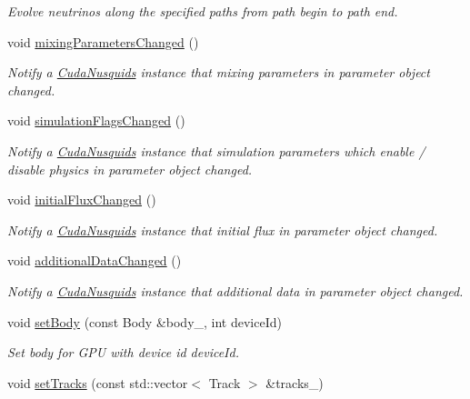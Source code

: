 \begin{DoxyCompactItemize}
\begin{DoxyCompactList}\small\item\em Evolve neutrinos along the specified paths from path begin to path end. \end{DoxyCompactList}\item 
void \hyperlink{classcudanusquids_1_1CudaNusquids_a8a61b830c0ac8650f4a52506b56c8c78}{mixing\+Parameters\+Changed} ()
\begin{DoxyCompactList}\small\item\em Notify a \hyperlink{classcudanusquids_1_1CudaNusquids}{Cuda\+Nusquids} instance that mixing parameters in parameter object changed. \end{DoxyCompactList}\item 
void \hyperlink{classcudanusquids_1_1CudaNusquids_ac3a20770b3e3a5d238bedea4d1e90272}{simulation\+Flags\+Changed} ()
\begin{DoxyCompactList}\small\item\em Notify a \hyperlink{classcudanusquids_1_1CudaNusquids}{Cuda\+Nusquids} instance that simulation parameters which enable / disable physics in parameter object changed. \end{DoxyCompactList}\item 
void \hyperlink{classcudanusquids_1_1CudaNusquids_a90201547b37fb8c0e9ec66d3a92f5a94}{initial\+Flux\+Changed} ()
\begin{DoxyCompactList}\small\item\em Notify a \hyperlink{classcudanusquids_1_1CudaNusquids}{Cuda\+Nusquids} instance that initial flux in parameter object changed. \end{DoxyCompactList}\item 
void \hyperlink{classcudanusquids_1_1CudaNusquids_a3024be5a16f1f77eeaff9453b0ee6e8e}{additional\+Data\+Changed} ()
\begin{DoxyCompactList}\small\item\em Notify a \hyperlink{classcudanusquids_1_1CudaNusquids}{Cuda\+Nusquids} instance that additional data in parameter object changed. \end{DoxyCompactList}\item 
void \hyperlink{classcudanusquids_1_1CudaNusquids_ad964b26a1df1c644b90c9ca607332f26}{set\+Body} (const Body \&body\+\_\+, int device\+Id)
\begin{DoxyCompactList}\small\item\em Set body for G\+PU with device id device\+Id. \end{DoxyCompactList}\item 
void \hyperlink{classcudanusquids_1_1CudaNusquids_a22cfcad0e0119c12ef7b0fb98d55f6fa}{set\+Tracks} (const std\+::vector$<$ Track $>$ \&tracks\+\_\+)\hypertarget{classcudanusquids_1_1CudaNusquids_a22cfcad0e0119c12ef7b0fb98d55f6fa}{}\label{classcudanusquids_1_1CudaNusquids_a22cfcad0e0119c12ef7b0fb98d55f6fa}


\end{DoxyCompactItemize}
